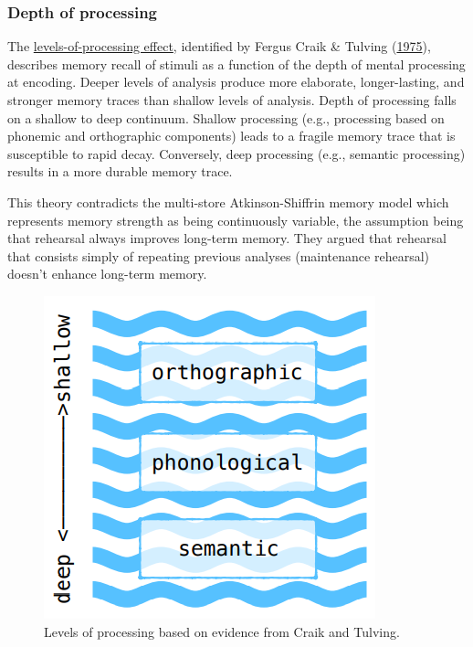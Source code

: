 \documentclass[
]{krantz}
\begin{document}
\hypertarget{depth-of-processing}{%
\subsubsection*{Depth of processing}\label{depth-of-processing}}


The \protect\hyperlink{levels-of-processing-effect}{levels-of-processing effect}, identified by Fergus Craik \& Tulving (\protect\hyperlink{ref-Craik1975}{1975}), describes memory recall of stimuli as a function of the depth of mental processing at encoding. Deeper levels of analysis produce more elaborate, longer-lasting, and stronger memory traces than shallow levels of analysis. Depth of processing falls on a shallow to deep continuum. Shallow processing (e.g., processing based on phonemic and orthographic components) leads to a fragile memory trace that is susceptible to rapid decay. Conversely, deep processing (e.g., semantic processing) results in a more durable memory trace.

This theory contradicts the multi-store Atkinson-Shiffrin memory model which represents memory strength as being continuously variable, the assumption being that rehearsal always improves long-term memory. They argued that rehearsal that consists simply of repeating previous analyses (maintenance rehearsal) doesn't enhance long-term memory.

\begin{figure}

{\centering \includegraphics[width=0.4\linewidth]{images/ch5/fig4} 

}

\caption{Levels of processing based on evidence from Craik and Tulving.}\label{fig:lop}
\end{figure}
\end{document}
